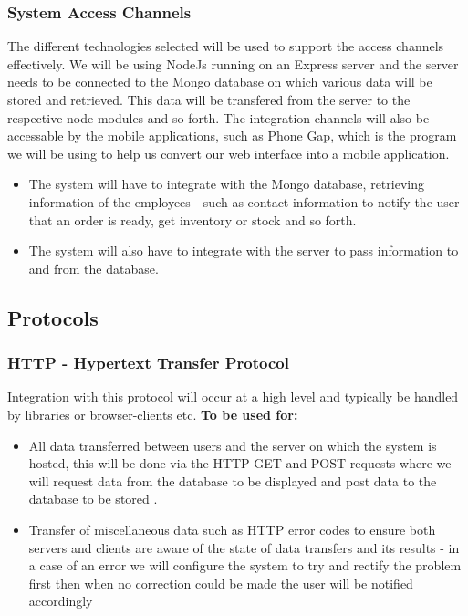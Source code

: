 \documentclass[a4paper,12pt]{article}
\begin{document}
\subsubsection{System Access Channels}
The different technologies selected will be used to support the access channels effectively. We will be using NodeJs running on an Express server and the server needs to be connected to the Mongo database on which various data will be stored and retrieved. This data will be transfered from the server to the respective node modules and so forth. 
The integration channels will also be accessable by the mobile applications, such as Phone Gap, which is the program we will be using to help us convert our web interface into a mobile application.
\begin{itemize}

\item The system will have to integrate with the Mongo database, retrieving information of the employees - such as contact information to notify the user that an order is ready, get inventory or stock and so forth. 

\item The system will also have to integrate with the server to pass information to and from the database.
\end{itemize}

\subsection{Protocols}
\subsubsection{HTTP - Hypertext Transfer Protocol}
Integration with this protocol will occur at a high level and typically be handled by libraries or browser-clients etc.
\textbf{To be used for:	}
	\begin{itemize}
	\item{All data transferred between users and the server on which the system is hosted, this will be done via the HTTP GET and 
	         POST requests where we will request data from the database  to be displayed and post data to the database to be 
		stored .}
	\item{Transfer of miscellaneous data such as HTTP error codes to ensure both servers and clients are aware of the state of 	
		data transfers and its results - in a case of an error we will configure the system to try and rectify the problem first then 
		when no correction could be made the user will be notified accordingly }
	\end{itemize}
	
\end{document}
